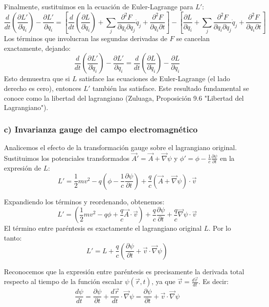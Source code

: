 \documentclass[a4paper]{article}
\begin{document}
Finalmente, sustituimos en la ecuación de Euler-Lagrange para $L'$:
$$\frac{d}{dt}\left(\frac{\partial L'}{\partial \dot{q}_i}\right) - \frac{\partial L'}{\partial q_i} = \left[ \frac{d}{dt}\left(\frac{\partial L}{\partial \dot{q}_i}\right) + \sum_{j} \frac{\partial^2 F}{\partial q_i \partial q_j}\dot{q}_j + \frac{\partial^2 F}{\partial q_i \partial t} \right] - \left[ \frac{\partial L}{\partial q_i} + \sum_{j} \frac{\partial^2 F}{\partial q_i \partial q_j}\dot{q}_j + \frac{\partial^2 F}{\partial q_i \partial t} \right]$$
Los términos que involucran las segundas derivadas de $F$ se cancelan exactamente, dejando:
$$\frac{d}{dt}\left(\frac{\partial L'}{\partial \dot{q}_i}\right) - \frac{\partial L'}{\partial q_i} = \frac{d}{dt}\left(\frac{\partial L}{\partial \dot{q}_i}\right) - \frac{\partial L}{\partial q_i}$$
Esto demuestra que si $L$ satisface las ecuaciones de Euler-Lagrange (el lado derecho es cero), entonces $L'$ también las satisface. Este resultado fundamental se conoce como la libertad del lagrangiano (Zuluaga, Proposición 9.6 "Libertad del Lagrangiano").

\subsubsection*{c) Invarianza gauge del campo electromagnético}

Analicemos el efecto de la transformación gauge sobre el lagrangiano original. Sustituimos los potenciales transformados $\vec{A}' = \vec{A} + \vec{\nabla}\psi$ y $\phi' = \phi - \frac{1}{c}\frac{\partial \psi}{\partial t}$ en la expresión de $L$:
$$L' = \frac{1}{2}mv^2 - q\left(\phi - \frac{1}{c}\frac{\partial \psi}{\partial t}\right) + \frac{q}{c}(\vec{A} + \vec{\nabla}\psi) \cdot \vec{v}$$

Expandiendo los términos y reordenando, obtenemos:
$$L' = \left( \frac{1}{2}mv^2 - q\phi + \frac{q}{c}\vec{A} \cdot \vec{v} \right) + \frac{q}{c}\frac{\partial \psi}{\partial t} + \frac{q}{c}\vec{\nabla}\psi \cdot \vec{v}$$
El término entre paréntesis es exactamente el lagrangiano original $L$. Por lo tanto:
$$L' = L + \frac{q}{c}\left( \frac{\partial \psi}{\partial t} + \vec{v} \cdot \vec{\nabla}\psi \right)$$

Reconocemos que la expresión entre paréntesis es precisamente la derivada total respecto al tiempo de la función escalar $\psi(\vec{r}, t)$, ya que $\vec{v} = \frac{d\vec{r}}{dt}$. Es decir:
$$\frac{d\psi}{dt} = \frac{\partial \psi}{\partial t} + \frac{d\vec{r}}{dt} \cdot \vec{\nabla}\psi = \frac{\partial \psi}{\partial t} + \vec{v} \cdot \vec{\nabla}\psi$$
\end{document}
